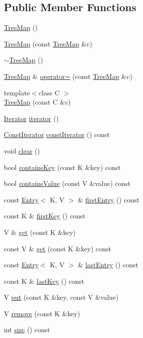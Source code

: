 \subsection*{Public Member Functions}
\begin{DoxyCompactItemize}
\item 
\hyperlink{class_tree_map_a593591d7d7c54568e71718f4c1f18372}{TreeMap} ()
\item 
\hyperlink{class_tree_map_ac8b2498e36f69506015935ff3a5f65ed}{TreeMap} (const \hyperlink{class_tree_map}{TreeMap} \&c)
\item 
\hyperlink{class_tree_map_a61ade1db7da7e51d738b030d8c877353}{$\sim$TreeMap} ()
\item 
\hyperlink{class_tree_map}{TreeMap} \& \hyperlink{class_tree_map_ac3807b00ab97c1aa3b28a99392f46c12}{operator=} (const \hyperlink{class_tree_map}{TreeMap} \&c)
\item 
{\footnotesize template$<$class C $>$ }\\\hyperlink{class_tree_map_a47d49805043cf06578efaf3f01f66a78}{TreeMap} (const C \&c)
\item 
\hyperlink{class_tree_map_1_1_iterator}{Iterator} \hyperlink{class_tree_map_a7ecfe50de55ccd84dd63198d06c7b403}{iterator} ()
\item 
\hyperlink{class_tree_map_1_1_const_iterator}{ConstIterator} \hyperlink{class_tree_map_a517b1bf341cfad0c491e8a4c67a9bf48}{constIterator} () const 
\item 
void \hyperlink{class_tree_map_a38e2b91c7f411cc38f8f904caaa56f92}{clear} ()
\item 
bool \hyperlink{class_tree_map_a1210e85fda1625a246bd38821234cfc1}{containsKey} (const K \&key) const 
\item 
bool \hyperlink{class_tree_map_aff9f0239099fa20f190f9278ec4caf24}{containsValue} (const V \&value) const 
\item 
const \hyperlink{class_entry}{Entry}$<$ K, V $>$ \& \hyperlink{class_tree_map_ad20aca04934bcd713a405007ca91d15a}{firstEntry} () const 
\item 
const K \& \hyperlink{class_tree_map_a2f99b33736297aa9152504bcc414c8fe}{firstKey} () const 
\item 
V \& \hyperlink{class_tree_map_a418b5b606f97a6d73533be37407e9ddf}{get} (const K \&key)
\item 
const V \& \hyperlink{class_tree_map_a77456cc28ea659dac453e607874f7981}{get} (const K \&key) const 
\item 
const \hyperlink{class_entry}{Entry}$<$ K, V $>$ \& \hyperlink{class_tree_map_a45cdf549345c3fe1c3b0c7fe045893f7}{lastEntry} () const 
\item 
const K \& \hyperlink{class_tree_map_aabab5c6afdddda058d680a904f9337b4}{lastKey} () const 
\item 
V \hyperlink{class_tree_map_a058a05ba6dbd11531477a55fb1cb0c02}{put} (const K \&key, const V \&value)
\item 
V \hyperlink{class_tree_map_a5dfe016edc0681f4352748683919672b}{remove} (const K \&key)
\item 
int \hyperlink{class_tree_map_ac8e67b70aca3ce24a9b4a2f27256690a}{size} () const 
\end{DoxyCompactItemize}


